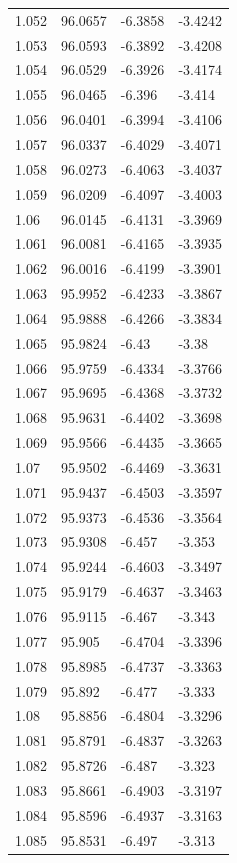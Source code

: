 \begin{tabular}{llll}
1.052 & 96.0657 & -6.3858 & -3.4242 \\
1.053 & 96.0593 & -6.3892 & -3.4208 \\
1.054 & 96.0529 & -6.3926 & -3.4174 \\
1.055 & 96.0465 & -6.396 & -3.414 \\
1.056 & 96.0401 & -6.3994 & -3.4106 \\
1.057 & 96.0337 & -6.4029 & -3.4071 \\
1.058 & 96.0273 & -6.4063 & -3.4037 \\
1.059 & 96.0209 & -6.4097 & -3.4003 \\
1.06 & 96.0145 & -6.4131 & -3.3969 \\
1.061 & 96.0081 & -6.4165 & -3.3935 \\
1.062 & 96.0016 & -6.4199 & -3.3901 \\
1.063 & 95.9952 & -6.4233 & -3.3867 \\
1.064 & 95.9888 & -6.4266 & -3.3834 \\
1.065 & 95.9824 & -6.43 & -3.38 \\
1.066 & 95.9759 & -6.4334 & -3.3766 \\
1.067 & 95.9695 & -6.4368 & -3.3732 \\
1.068 & 95.9631 & -6.4402 & -3.3698 \\
1.069 & 95.9566 & -6.4435 & -3.3665 \\
1.07 & 95.9502 & -6.4469 & -3.3631 \\
1.071 & 95.9437 & -6.4503 & -3.3597 \\
1.072 & 95.9373 & -6.4536 & -3.3564 \\
1.073 & 95.9308 & -6.457 & -3.353 \\
1.074 & 95.9244 & -6.4603 & -3.3497 \\
1.075 & 95.9179 & -6.4637 & -3.3463 \\
1.076 & 95.9115 & -6.467 & -3.343 \\
1.077 & 95.905 & -6.4704 & -3.3396 \\
1.078 & 95.8985 & -6.4737 & -3.3363 \\
1.079 & 95.892 & -6.477 & -3.333 \\
1.08 & 95.8856 & -6.4804 & -3.3296 \\
1.081 & 95.8791 & -6.4837 & -3.3263 \\
1.082 & 95.8726 & -6.487 & -3.323 \\
1.083 & 95.8661 & -6.4903 & -3.3197 \\
1.084 & 95.8596 & -6.4937 & -3.3163 \\
1.085 & 95.8531 & -6.497 & -3.313 \\

\end{tabular}

